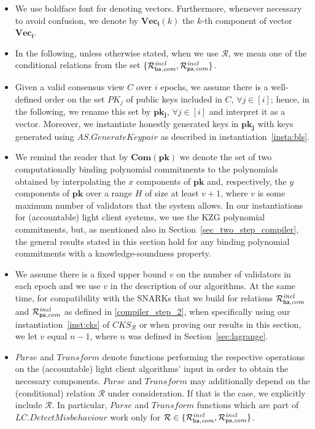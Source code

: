 \begin{itemize}
\item We use boldface font for denoting vectors. Furthermore, whenever necessary to avoid confusion, 
we denote by $\mathbf{Vec_i}(k)$ the $k$-th component of vector $\mathbf{Vec_i}$. 

\item In the following, unless otherwise stated, when we use $\mathcal{R}$, we mean one of the conditional relations from the set 
$\{ \mathcal{R}^{\mathit{incl}}_{\mathsf{ba},\mathit{com}}, \mathcal{R}^{\mathit{incl}}_{\mathsf{pa},\mathit{com}}\}$.%

\item Given a valid consensus view $C$ over $i$ epochs, we assume there is a well-defined order on the set $\mathit{PK_j}$  
of public keys included in $C$, $\forall j \in [i]$; hence, in the following, we rename this set by $\mathbf{pk_j}$, $\forall j \in [i]$ 
and interpret it as a vector. Moreover, we instantiate honestly generated keys in $\mathbf{pk_j}$ with keys generated using 
$\mathit{AS.GenerateKeypair}$ as described in instantiation~\ref{insta:bls}.
  
\item We remind the reader that by $\mathbf{Com}(\mathbf{pk})$ we denote the set of two computationally binding polynomial 
commitments to the polynomials obtained by interpolating the $x$ components of $\mathbf{pk}$ and, respectively, the $y$ 
components of $\mathbf{pk}$ over a range $H$ of size at least $v+1$, where $v$ is some maximum number of validators that the system allows. 
In our instantiations for (accountable) light client systems, we use the KZG polynomial commitments, but, as mentioned also in 
Section~\ref{sec_two_step_compiler}, the general results stated in this section hold for any binding polynomial commitments with a knowledge-soundness property.

\item We assume there is a fixed upper bound $v$ on the number of validators in each epoch and we use $v$ in the description of our algorithms. 
At the same time, for compatibility with the SNARKs that we build for relations $\mathcal{R}^{\mathit{incl}}_{\mathsf{ba},\mathit{com}}$ and $\mathcal{R}^{\mathit{incl}}_{\mathsf{pa},\mathit{com}}$ as defined 
in \ref{compiler_step_2}, when specifically using our instantiation~\ref{inst:cks} of $\mathit{CKS_{\mathcal{R}}}$ or when proving our results in this section, we 
let $v$ equal $n-1$, where $n$ was defined in Section~\ref{sec:lagrange}. 

\item $\mathit{Parse}$ and $\mathit{Transform}$ denote functions performing the respective operations on the 
(accountable) light client algorithms' input in order to obtain the necessary components. $\mathit{Parse}$ and $\mathit{Transform}$ 
may additionally depend on the (conditional) relation $\mathcal{R}$ under consideration. If that is the case, we explicitly include 
$\mathcal{R}$. In particular, $\mathit{Parse}$ and $\mathit{Transform}$ functions which are part of $\mathit{LC.DetectMisbehaviour}$ 
work only for $\mathcal{R} \in \{ \mathcal{R}^{\mathit{incl}}_{\mathsf{ba},\mathit{com}}, \mathcal{R}^{\mathit{incl}}_{\mathsf{pa},\mathit{com}} \}$. 


\end{itemize}
